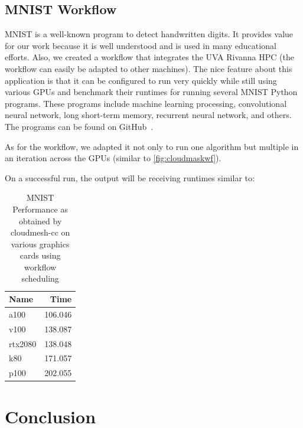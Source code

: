 \documentclass[sigplan,screen]{acmart}
\newcommand{\FILE}[1]{}
\begin{document}
%

\FILE{mnist.tex}

\subsection{MNIST Workflow}\label{mnist-workflow}

MNIST is a well-known program to detect handwritten digits. It
provides value for our work because it is well understood and is used
in many educational efforts. Also, we created a workflow that
integrates the UVA Rivanna HPC (the workflow can easily be adapted to other
machines). The nice feature about this application is that it can be
configured to run very quickly while still using various GPUs and
benchmark their runtimes for running several MNIST Python
programs. These programs include machine learning processing,
convolutional neural network, long short-term memory, recurrent neural
network, and others. The programs can be found on
GitHub~\cite{www-mnist-programs}.

As for the workflow, we adapted it not only to run one algorithm but
multiple in an iteration across the GPUs (similar to
\ref{fig:cloudmaskwf}).

On a successful run, the output will be receiving runtimes similar to:

\begin{table}[!ht]
\caption{MNIST Performance as obtained by cloudmesh-cc on various graphics cards using workflow scheduling}
    \centering
    \begin{tabular}{lr}
    \hline
        Name & Time \\ \hline
        a100 & 106.046 \\ 
        v100 & 138.087 \\ 
        rtx2080 & 138.048 \\
        k80 & 171.057 \\ 
        p100 & 202.055 \\
    \end{tabular}
    \label{table:mnist-times}
  \end{table}
  


% 

\FILE{conclusion.tex}

\section{Conclusion}
\end{document}
